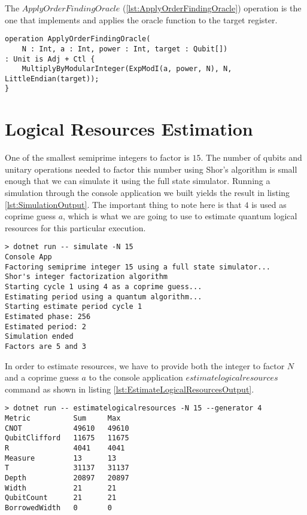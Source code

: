 The $ApplyOrderFindingOracle$ (\ref{lst:ApplyOrderFindingOracle}) operation is the one that implements and applies the oracle function to the target register.

\begin{lstlisting}[language=qsharp,label=lst:ApplyOrderFindingOracle,caption={Q\# implementation of the ApplyOrderFindingOracle operation}]
operation ApplyOrderFindingOracle(
    N : Int, a : Int, power : Int, target : Qubit[])
: Unit is Adj + Ctl {
    MultiplyByModularInteger(ExpModI(a, power, N), N, LittleEndian(target));
}
\end{lstlisting}

\section{Logical Resources Estimation}

One of the smallest semiprime integers to factor is $15$. The number of qubits and unitary operations needed to factor this number using Shor's algorithm is small enough that we can simulate it using the full state simulator. Running a simulation through the console application we built yields the result in listing \ref{lst:SimulationOutput}. The important thing to note here is that $4$ is used as coprime guess $a$, which is what we are going to use to estimate quantum logical resources for this particular execution.
\begin{lstlisting}[label=lst:SimulationOutput,caption={Output of simulating Shor's algorithm on a full-state simulator}]
> dotnet run -- simulate -N 15
Console App
Factoring semiprime integer 15 using a full state simulator...
Shor's integer factorization algorithm
Starting cycle 1 using 4 as a coprime guess...
Estimating period using a quantum algorithm...
Starting estimate period cycle 1
Estimated phase: 256
Estimated period: 2
Simulation ended
Factors are 5 and 3
\end{lstlisting}

In order to estimate resources, we have to provide both the integer to factor $N$ and a coprime guess $a$ to the console application $estimatelogicalresources$ command as shown in listing \ref{lst:EstimateLogicalResourcesOutput}.
\begin{lstlisting}[label=lst:EstimateLogicalResourcesOutput,caption={Output of estimating logical resources for Shor's algorithm}]
> dotnet run -- estimatelogicalresources -N 15 --generator 4
Metric          Sum     Max
CNOT            49610   49610
QubitClifford   11675   11675
R               4041    4041
Measure         13      13
T               31137   31137
Depth           20897   20897
Width           21      21
QubitCount      21      21
BorrowedWidth   0       0
\end{lstlisting}

